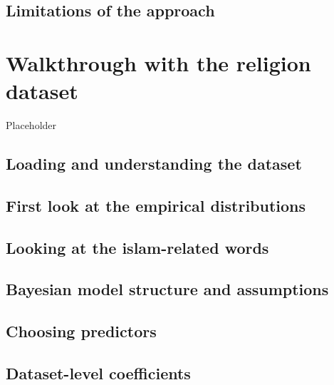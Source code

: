 \documentclass[
  12pt,
]{book}
\begin{document}
\hypertarget{limitations-of-the-approach}{%
\section{Limitations of the approach}\label{limitations-of-the-approach}}

\hypertarget{walkthrough-with-the-religion-dataset}{%
\chapter{Walkthrough with the religion dataset}\label{walkthrough-with-the-religion-dataset}}

Placeholder

\hypertarget{loading-and-understanding-the-dataset}{%
\section{Loading and understanding the dataset}\label{loading-and-understanding-the-dataset}}

\hypertarget{first-look-at-the-empirical-distributions}{%
\section{First look at the empirical distributions}\label{first-look-at-the-empirical-distributions}}

\hypertarget{looking-at-the-islam-related-words}{%
\section{Looking at the islam-related words}\label{looking-at-the-islam-related-words}}

\hypertarget{bayesian-model-structure-and-assumptions}{%
\section{Bayesian model structure and assumptions}\label{bayesian-model-structure-and-assumptions}}

\hypertarget{choosing-predictors}{%
\section{Choosing predictors}\label{choosing-predictors}}

\hypertarget{dataset-level-coefficients}{%
\section{Dataset-level coefficients}\label{dataset-level-coefficients}}
\end{document}
